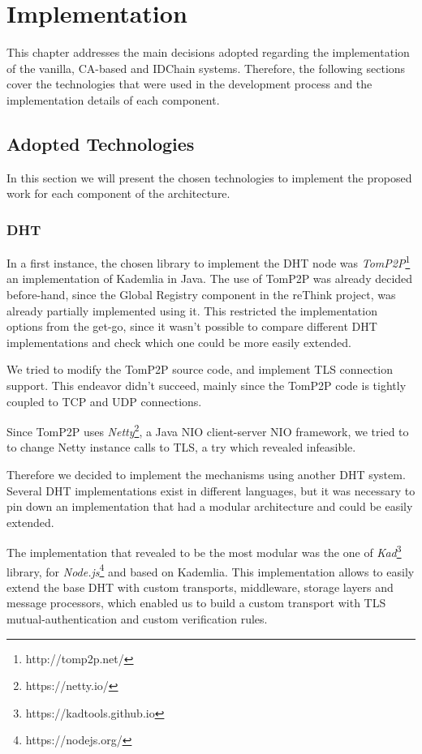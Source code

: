 \chapter{Implementation}
\label{chapter:implementation}

This chapter addresses the main decisions adopted regarding the implementation of the vanilla, CA-based and IDChain systems. Therefore, the following sections cover the technologies that were used in the development process and the implementation details of each component.

\section{Adopted Technologies}

In this section we will present the chosen technologies to implement the proposed work for each component of the architecture.

\subsection{DHT}

In a first instance, the chosen library to implement the DHT node was \textit{TomP2P}\footnote{http://tomp2p.net/} an implementation of Kademlia in Java.
The use of TomP2P was already decided before-hand, since the Global Registry component in the reThink project, was already partially implemented using it.
This restricted the implementation options from the get-go, since it wasn't possible to compare different \ac{DHT} implementations and check which one could be more easily extended.

We tried to modify the TomP2P source code, and implement TLS connection support.
This endeavor didn't succeed, mainly since the TomP2P code is tightly coupled to TCP and UDP connections.

Since TomP2P uses \textit{Netty}\footnote{https://netty.io/}, a Java NIO client-server \ac{NIO} framework, we tried to to change Netty instance calls to TLS, a try which revealed infeasible.

Therefore we decided to implement the mechanisms using another DHT system.
Several DHT implementations exist in different languages, but it was necessary to pin down an implementation that had a modular architecture and could be easily extended.

The implementation that revealed to be the most modular was the one of \textit{Kad}\footnote{https://kadtools.github.io} library, for \textit{Node.js}\footnote{https://nodejs.org/} and based on Kademlia.
This implementation allows to easily extend the base DHT with custom transports, middleware, storage layers and message processors, which enabled us to build a custom transport with TLS mutual-authentication and custom verification rules.

